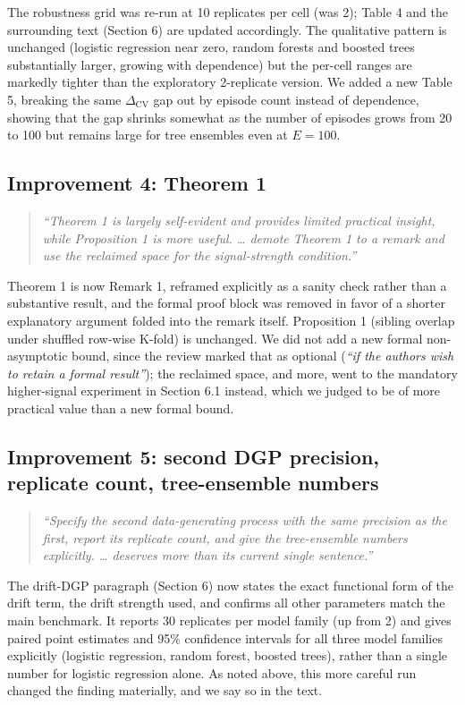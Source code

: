 \documentclass[11pt]{article}
\newcommand{\DeltaCV}{\Delta_{\text{CV}}}
\newcommand{\rc}[1]{\textit{``#1''}}
\newenvironment{response}{\begin{quote}\color{black}}{\end{quote}}
\begin{document}
The robustness grid was re-run at 10 replicates per cell (was 2); Table 4 and the surrounding text (Section 6) are updated accordingly. The qualitative pattern is unchanged (logistic regression near zero, random forests and boosted trees substantially larger, growing with dependence) but the per-cell ranges are markedly tighter than the exploratory 2-replicate version. We added a new Table 5, breaking the same $\DeltaCV$ gap out by episode count instead of dependence, showing that the gap shrinks somewhat as the number of episodes grows from 20 to 100 but remains large for tree ensembles even at $E=100$.

\subsection*{Improvement 4: Theorem 1}

\begin{response}
\rc{Theorem 1 is largely self-evident and provides limited practical insight, while Proposition 1 is more useful. \dots{} demote Theorem 1 to a remark and use the reclaimed space for the signal-strength condition.}
\end{response}

Theorem 1 is now Remark 1, reframed explicitly as a sanity check rather than a substantive result, and the formal proof block was removed in favor of a shorter explanatory argument folded into the remark itself. Proposition 1 (sibling overlap under shuffled row-wise K-fold) is unchanged. We did not add a new formal non-asymptotic bound, since the review marked that as optional (\rc{if the authors wish to retain a formal result}); the reclaimed space, and more, went to the mandatory higher-signal experiment in Section 6.1 instead, which we judged to be of more practical value than a new formal bound.

\subsection*{Improvement 5: second DGP precision, replicate count, tree-ensemble numbers}

\begin{response}
\rc{Specify the second data-generating process with the same precision as the first, report its replicate count, and give the tree-ensemble numbers explicitly. \dots{} deserves more than its current single sentence.}
\end{response}

The drift-DGP paragraph (Section 6) now states the exact functional form of the drift term, the drift strength used, and confirms all other parameters match the main benchmark. It reports 30 replicates per model family (up from 2) and gives paired point estimates and 95\% confidence intervals for all three model families explicitly (logistic regression, random forest, boosted trees), rather than a single number for logistic regression alone. As noted above, this more careful run changed the finding materially, and we say so in the text.
\end{document}
